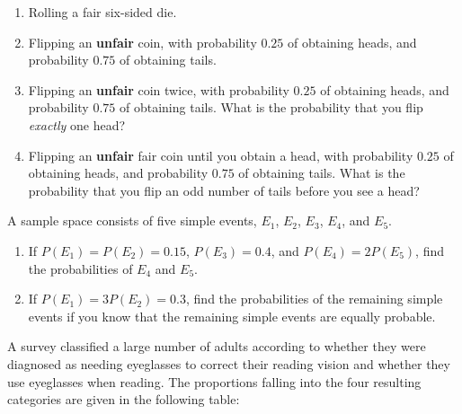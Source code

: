 \documentclass[12pt,reqno]{amsart}
\begin{document}
\medskip
\begin{enumerate}
\item Rolling a fair six-sided die.\vfill
\item Flipping an \textbf{unfair} coin, with probability $0.25$ of obtaining heads, and probability $0.75$ of obtaining tails.\vfill
\item Flipping an \textbf{unfair} coin twice, with probability $0.25$ of obtaining heads, and probability $0.75$ of obtaining tails. What is the probability that you flip \textit{exactly} one head?\vfill
\item Flipping an \textbf{unfair} fair coin until you obtain a head, with probability $0.25$ of obtaining heads, and probability $0.75$ of obtaining tails. What is the probability that you flip an odd number of tails before you see a head?\vfill
\end{enumerate}


















\prob A sample space consists of five simple events, $E_1$, $E_2$, $E_3$, $E_4$, and $E_5$.

\medskip
\begin{enumerate}
\item If $P(E_1) = P(E_2) = 0.15$, $P(E_3) = 0.4$, and $P(E_4) = 2P(E_5)$, find the probabilities of $E_4$ and $E_5$.\vfill
\item If $P(E_1) = 3P(E_2) = 0.3$, find the probabilities of the remaining simple events if you know that the remaining simple events are equally probable.\vfill
\end{enumerate}















\newpage
\prob A survey classified a large number of adults according to whether they were diagnosed as needing eyeglasses to correct their reading vision and whether they use eyeglasses when reading. The proportions falling into the four resulting categories are given in the following table:
\end{document}

